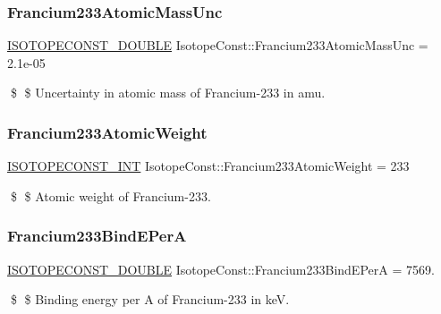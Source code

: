 \subsubsection{\texorpdfstring{Francium233\+Atomic\+Mass\+Unc}{Francium233AtomicMassUnc}}
{\footnotesize\ttfamily \mbox{\hyperlink{group___isotope_const-_macros_ga8f45a7272ce02c0b4c65c44636ed719a}{I\+S\+O\+T\+O\+P\+E\+C\+O\+N\+S\+T\+\_\+\+D\+O\+U\+B\+LE}} Isotope\+Const\+::\+Francium233\+Atomic\+Mass\+Unc = 2.\+1e-\/05}

\$ \$ Uncertainty in atomic mass of Francium-\/233 in amu. \mbox{\label{group___isotope_const-_francium-_fr233_ga7518f655a168dace9368ce067d91918d}} 
\subsubsection{\texorpdfstring{Francium233\+Atomic\+Weight}{Francium233AtomicWeight}}
{\footnotesize\ttfamily \mbox{\hyperlink{group___isotope_const-_macros_ga5f18360b3e99483a35c32d789e62621c}{I\+S\+O\+T\+O\+P\+E\+C\+O\+N\+S\+T\+\_\+\+I\+NT}} Isotope\+Const\+::\+Francium233\+Atomic\+Weight = 233}

\$ \$ Atomic weight of Francium-\/233. \mbox{\label{group___isotope_const-_francium-_fr233_gac5870ffd117aa6aa7d3bbfa8666ce4c4}} 
\subsubsection{\texorpdfstring{Francium233\+Bind\+E\+PerA}{Francium233BindEPerA}}
{\footnotesize\ttfamily \mbox{\hyperlink{group___isotope_const-_macros_ga8f45a7272ce02c0b4c65c44636ed719a}{I\+S\+O\+T\+O\+P\+E\+C\+O\+N\+S\+T\+\_\+\+D\+O\+U\+B\+LE}} Isotope\+Const\+::\+Francium233\+Bind\+E\+PerA = 7569.}

\$ \$ Binding energy per A of Francium-\/233 in keV. \mbox{\label{group___isotope_const-_francium-_fr233_gaf890f6cea6639c0e57b74504a1af831a}} 
